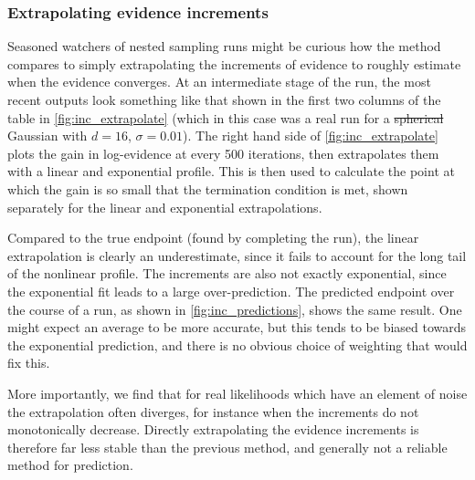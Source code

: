 \documentclass[usenatbib]{mnras}
\providecommand{\DIFaddtex}[1]{{\protect\color{blue}\uwave{#1}}} %
\providecommand{\DIFdeltex}[1]{{\protect\color{red}\sout{#1}}}                      %
\providecommand{\DIFaddbegin}{} %
\providecommand{\DIFaddend}{} %
\providecommand{\DIFdelbegin}{} %
\providecommand{\DIFdelend}{} %
\providecommand{\DIFadd}[1]{\texorpdfstring{\DIFaddtex{#1}}{#1}} %
\providecommand{\DIFdel}[1]{\texorpdfstring{\DIFdeltex{#1}}{}} %
\newcommand{\DIFscaledelfig}{0.5}
\newlength{\DIFdelgraphicswidth} %
\newlength{\DIFdelgraphicsheight} %
\newcommand{\DIFaddincludegraphics}[2][]{{\color{blue}\fbox{\DIFOincludegraphics[#1]{#2}}}} %
\newcommand{\DIFdelincludegraphics}[2][]{%
\sbox{\DIFdelgraphicsbox}{\DIFOincludegraphics[#1]{#2}}%
\settoboxwidth{\DIFdelgraphicswidth}{\DIFdelgraphicsbox} %
\settoboxtotalheight{\DIFdelgraphicsheight}{\DIFdelgraphicsbox} %
\scalebox{\DIFscaledelfig}{%
\parbox[b]{\DIFdelgraphicswidth}{\usebox{\DIFdelgraphicsbox}\\[-\baselineskip] \rule{\DIFdelgraphicswidth}{0em}}\llap{\resizebox{\DIFdelgraphicswidth}{\DIFdelgraphicsheight}{%
\setlength{\unitlength}{\DIFdelgraphicswidth}%
\begin{picture}(1,1)%
\thicklines\linethickness{2pt} %
{\color[rgb]{1,0,0}\put(0,0){\framebox(1,1){}}}%
{\color[rgb]{1,0,0}\put(0,0){\line( 1,1){1}}}%
{\color[rgb]{1,0,0}\put(0,1){\line(1,-1){1}}}%
\end{picture}%
}\hspace*{3pt}}} %
} %
\DeclareRobustCommand{\DIFaddbegin}{\DIFOaddbegin \let\includegraphics\DIFaddincludegraphics} %
\DeclareRobustCommand{\DIFaddend}{\DIFOaddend \let\includegraphics\DIFOincludegraphics} %
\DeclareRobustCommand{\DIFdelbegin}{\DIFOdelbegin \let\includegraphics\DIFdelincludegraphics} %
\DeclareRobustCommand{\DIFdelend}{\DIFOaddend \let\includegraphics\DIFOincludegraphics} %
\begin{document}
\subsubsection{Extrapolating evidence increments}
Seasoned watchers of nested sampling runs might be curious how the method compares to simply extrapolating the increments of evidence to roughly estimate when the evidence converges. At an intermediate stage of the run, the most recent outputs look something like that shown in the first two columns of the table in \cref{fig:inc_extrapolate} (which in this case was a real run for a \DIFdelbegin \DIFdel{spherical }\DIFdelend \DIFaddbegin \DIFadd{isotropic }\DIFaddend Gaussian with $d = 16$, $\sigma = 0.01$). The right hand side of \cref{fig:inc_extrapolate} plots the gain in log-evidence at every 500 iterations, then extrapolates them with a linear and exponential profile. This is then used to calculate the point at which the gain is so small that the termination condition is met, shown separately for the linear and exponential extrapolations.
\par
Compared to the true endpoint (found by completing the run), the linear extrapolation is clearly an underestimate, since it fails to account for the long tail of the nonlinear profile. The increments are also not exactly exponential, since the exponential fit leads to a large over-prediction. The predicted endpoint over the course of a run, as shown in \cref{fig:inc_predictions}, shows the same result. One might expect an average to be more accurate, but this tends to be biased towards the exponential prediction, and there is no obvious choice of weighting that would fix this.
\par
More importantly, we find that for real likelihoods which have an element of noise the extrapolation often diverges, for instance when the increments do not monotonically decrease. Directly extrapolating the evidence increments is therefore far less stable than the previous method, and generally not a reliable method for prediction.
\end{document}
